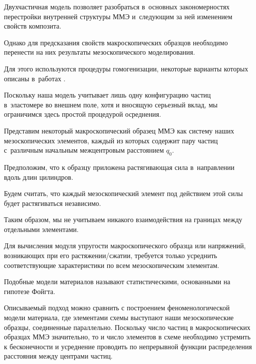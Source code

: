 





Двухчастичная модель позволяет ра\-зобраться в~основных закономерностях перестройки внутренней структуры ММЭ и~следующим за ней изменением свойств композита. 

Однако для предсказания свойств макроскопических образцов необходимо перенести на них результаты мезоскопического моделирования. 

Для этого используются процедуры гомогенизации,  некоторые варианты которых описаны в~работах \cite{Castaneda_11,Menzel_14}. 

Поскольку наша модель учитывает лишь одну конфигурацию частиц в~эластомере во внешнем поле, хотя и вносящую серьезный вклад, мы ограничимся здесь простой процедурой осреднения.



Представим некоторый макроскопический образец ММЭ как систему наших мезоскопических элементов, каждый из которых содержит пару частиц с~различным начальным межцентровым расстоянием $q_0$. 

Предположим, что к образцу приложена растягивающая сила в~направлении вдоль длин цилиндров. 

Будем считать, что каждый мезоскопический элемент под действием этой силы будет растягиваться независимо. 

Таким образом, мы не учитываем никакого взаимодействия на границах между отдельными элементами. 

Для вычисления модуля упругости макроскопического образца или напряжений, возникающих при его растяжении/сжатии, требуется только усреднить соответствующие характеристики по всем мезоскопическим элементам. 

Подобные модели материалов называют статистическими, основанными на гипотезе Фойгта. 



Описываемый подход можно сравнить с построением феноменологической модели материала, где элементами схемы выступают наши мезоскопические образцы, соединенные параллельно. Поскольку число частиц в макроскопических образцах ММЭ значительно, то и число элементов в схеме необходимо устремить к бесконечности и усреднение проводить по непрерывной функции распределения расстояния между центрами частиц. 

